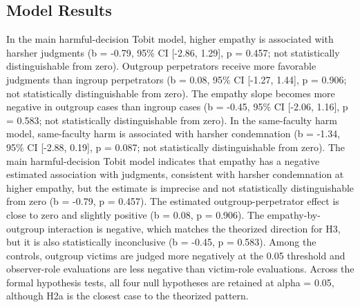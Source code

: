 \documentclass[11pt]{article}
\begin{document}
\subsection{Model Results}
In the main harmful-decision Tobit model, higher empathy is associated with harsher judgments (b = -0.79, 95\% CI [-2.86, 1.29], p = 0.457; not statistically distinguishable from zero). Outgroup perpetrators receive more favorable judgments than ingroup perpetrators (b = 0.08, 95\% CI [-1.27, 1.44], p = 0.906; not statistically distinguishable from zero). The empathy slope becomes more negative in outgroup cases than ingroup cases (b = -0.45, 95\% CI [-2.06, 1.16], p = 0.583; not statistically distinguishable from zero). In the same-faculty harm model, same-faculty harm is associated with harsher condemnation (b = -1.34, 95\% CI [-2.88, 0.19], p = 0.087; not statistically distinguishable from zero).
The main harmful-decision Tobit model indicates that empathy has a negative estimated association with judgments, consistent with harsher condemnation at higher empathy, but the estimate is imprecise and not statistically distinguishable from zero (b = -0.79, p = 0.457). The estimated outgroup-perpetrator effect is close to zero and slightly positive (b = 0.08, p = 0.906). The empathy-by-outgroup interaction is negative, which matches the theorized direction for H3, but it is also statistically inconclusive (b = -0.45, p = 0.583). Among the controls, outgroup victims are judged more negatively at the 0.05 threshold and observer-role evaluations are less negative than victim-role evaluations. Across the formal hypothesis tests, all four null hypotheses are retained at alpha = 0.05, although H2a is the closest case to the theorized pattern.
\end{document}

